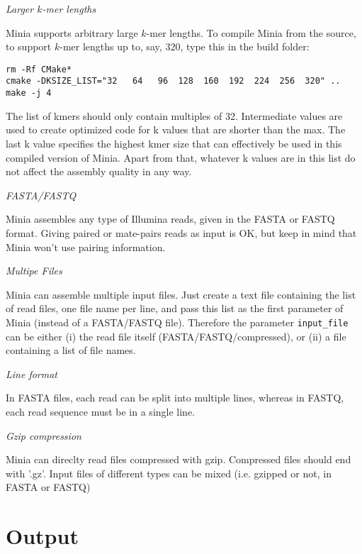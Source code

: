 \documentclass[a4paper]{article}
\begin{document}
\begin{description}
\item \emph{Larger $k$-mer lengths}

Minia supports arbitrary large $k$-mer lengths. To compile Minia from the source, to support $k$-mer lengths up to, say, 320, type this in the build folder:
\begin{verbatim}
rm -Rf CMake*
cmake -DKSIZE_LIST="32   64   96  128  160  192  224  256  320" ..
make -j 4
\end{verbatim}

The list of kmers should only contain multiples of 32. Intermediate values are used to create optimized code for k values that are shorter than the max. The last k value specifies the highest kmer size that can effectively be used in this compiled version of Minia. Apart from that, whatever k values are in this list do not affect the assembly quality in any way.

\item \emph{FASTA/FASTQ}

Minia assembles any type of Illumina reads, given in the FASTA or FASTQ format. Giving paired or mate-pairs reads as input is OK, but keep in mind that Minia won't use pairing information.
\item \emph{Multipe Files}

 Minia can assemble multiple input files. Just create a text file containing the list of read files, one file name per line, and pass this list as the first parameter of Minia (instead of a FASTA/FASTQ file). Therefore the parameter \verb+input_file+ can be either (i) the read file itself (FASTA/FASTQ/compressed), or (ii) a file containing a list of file names.

\item \emph{Line format}

 In FASTA files, each read can be split into multiple lines, whereas in FASTQ, each read sequence must be in a single line.

\item \emph{Gzip compression}

Minia can direclty read files compressed with gzip. Compressed files should end with '.gz'. Input files of different types can be mixed (i.e. gzipped or not, in FASTA or FASTQ)

\end{description}

\section{Output}
\end{document}

